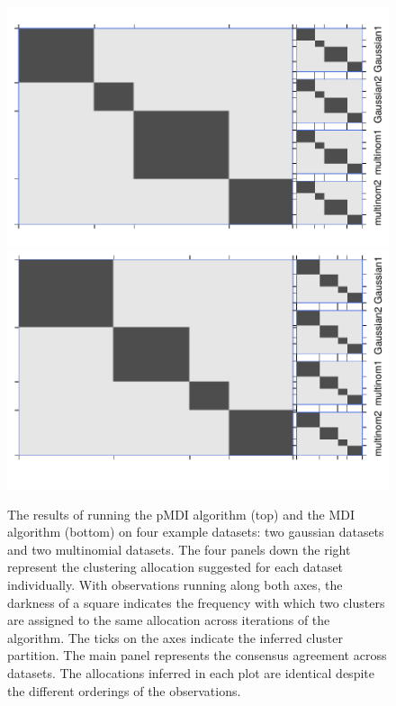 \documentclass[10pt,a4paper]{article}
\begin{document}
\begin{center}
\begin{figure}
\includegraphics{Plots/consensus_final.pdf}
\includegraphics{Plots/MDI_consensus.pdf}
\caption{The results of running the pMDI algorithm (top) and the MDI algorithm (bottom) on four example datasets: two gaussian datasets and two multinomial datasets. The four panels down the right represent the clustering allocation suggested for each dataset individually. With observations running along both axes, the darkness of a square indicates the frequency with which two clusters are assigned to the same allocation across iterations of the algorithm. The ticks on the axes indicate the inferred cluster partition. The main panel represents the consensus agreement across datasets. The allocations inferred in each plot are identical despite the different orderings of the observations.}
\label{fig:consensus}
\end{figure}
\end{center}
\end{document}

